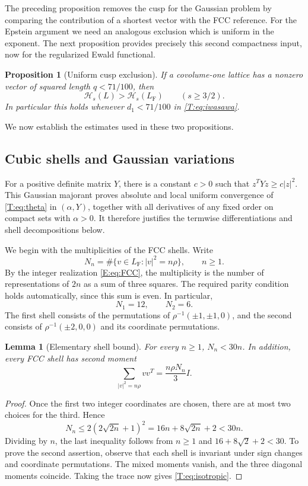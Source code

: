 \documentclass[reqno,english]{amsart}
\newtheorem{lemma}[theorem]{Lemma}
\newtheorem{proposition}[theorem]{Proposition}
\theoremstyle{definition}
\newtheorem{open problem}[theorem]{Open Problem}
\theoremstyle{remark}
\theoremstyle{plain}
\numberwithin{equation}{section}
\newcommand{\FCC}{L_{\mathrm F}}
\newcommand{\HH}{\mathcal H}
\newcommand{\Id}{I}
\begin{document}
The preceding proposition removes the cusp for the Gaussian problem by comparing the contribution of a shortest vector with the FCC reference. For the Epstein argument we need an analogous exclusion which is uniform in the exponent. The next proposition provides precisely this second compactness input, now for the regularized Ewald functional.

\begin{proposition}[Uniform cusp exclusion]\label{E:prop:cusp}
If a covolume-one lattice has a nonzero vector of squared length $q<71/100$, then
\[
 \HH_s(L)>\HH_s(\FCC)\qquad(s\ge3/2).
\]
In particular this holds whenever $d_1<71/100$ in \eqref{T:eq:iwasawa}.
\end{proposition}

We now establish the estimates used in these two propositions.

\subsection{Cubic shells and Gaussian variations}\label{sec:cubic-shells}\label{T:app:constants}
For a positive definite matrix $Y$, there is a constant $c>0$ such
that $z^TYz\ge c|z|^2$. This Gaussian majorant proves absolute and
local uniform convergence of \eqref{T:eq:theta} in $(\alpha,Y)$,
together with all derivatives of any fixed order on compact sets with
$\alpha>0$. It therefore justifies the termwise differentiations and
shell decompositions below.

We begin with the multiplicities of the FCC shells. Write
\begin{equation}\label{T:eq:shells}
 N_n=\#\{v\in\FCC:|v|^2=n\rho\},\qquad n\ge1.
\end{equation}
By the integer realization \eqref{E:eq:FCC}, the multiplicity is the
number of representations of $2n$ as a sum of three squares. The
required parity condition holds automatically, since this sum is even.
In particular,
\begin{equation}\label{T:eq:firstcounts}
 N_1=12,\qquad N_2=6.
\end{equation}
The first shell consists of the permutations of $\rho^{-1}(\pm1,\pm1,0)$, and the second consists of $\rho^{-1}(\pm2,0,0)$ and its coordinate permutations.

\begin{lemma}[Elementary shell bound]\label{T:lem:shellbound}
For every $n\ge1$, $N_n<30n$. In addition, every FCC shell has second moment
\begin{equation}\label{T:eq:isotropic}
 \sum_{|v|^2=n\rho}vv^T=\frac{n\rho N_n}{3}\Id.
\end{equation}
\end{lemma}
\begin{proof}
Once the first two integer coordinates are chosen, there are at most two choices for the third. Hence
\[
 N_n\le2(2\sqrt{2n}+1)^2
 =16n+8\sqrt{2n}+2<30n.
\]
Dividing by $n$, the last inequality follows from $n\ge1$ and
$16+8\sqrt2+2<30$. To prove the second assertion, observe that each
shell is invariant under sign changes and coordinate permutations.
The mixed moments vanish, and the three diagonal moments coincide.
Taking the trace now gives \eqref{T:eq:isotropic}.
\end{proof}
\end{document}
